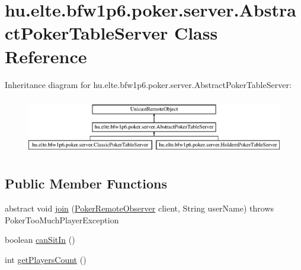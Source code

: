 \hypertarget{classhu_1_1elte_1_1bfw1p6_1_1poker_1_1server_1_1_abstract_poker_table_server}{}\section{hu.\+elte.\+bfw1p6.\+poker.\+server.\+Abstract\+Poker\+Table\+Server Class Reference}
\label{classhu_1_1elte_1_1bfw1p6_1_1poker_1_1server_1_1_abstract_poker_table_server}
Inheritance diagram for hu.\+elte.\+bfw1p6.\+poker.\+server.\+Abstract\+Poker\+Table\+Server\+:\begin{figure}[H]
\begin{center}
\leavevmode
\includegraphics[height=2.514970cm]{classhu_1_1elte_1_1bfw1p6_1_1poker_1_1server_1_1_abstract_poker_table_server}
\end{center}
\end{figure}
\subsection*{Public Member Functions}
\begin{DoxyCompactItemize}
\item 
abstract void \hyperlink{classhu_1_1elte_1_1bfw1p6_1_1poker_1_1server_1_1_abstract_poker_table_server_a47bdf7f5fb404275852ee8c40f017557}{join} (\hyperlink{interfacehu_1_1elte_1_1bfw1p6_1_1poker_1_1client_1_1observer_1_1_poker_remote_observer}{Poker\+Remote\+Observer} client, String user\+Name)  throws Poker\+Too\+Much\+Player\+Exception
\item 
boolean \hyperlink{classhu_1_1elte_1_1bfw1p6_1_1poker_1_1server_1_1_abstract_poker_table_server_a212712e261bb08055e2ab86c7f42b92a}{can\+Sit\+In} ()
\item 
int \hyperlink{classhu_1_1elte_1_1bfw1p6_1_1poker_1_1server_1_1_abstract_poker_table_server_a2277b4d7bac268b2947358712e25005a}{get\+Players\+Count} ()
\end{DoxyCompactItemize}
